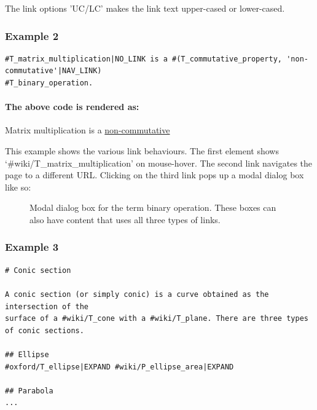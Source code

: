 \documentclass[runningheads]{llncs}
\begin{document}
The link options 'UC/LC' makes the link text upper-cased or lower-cased.

\subsubsection*{Example 2}
\begin{verbatim}
#T_matrix_multiplication|NO_LINK is a #(T_commutative_property, 'non-commutative'|NAV_LINK)
#T_binary_operation.
\end{verbatim}

\paragraph{The above code is rendered as:}
\begin{mdframed}
Matrix multiplication is a \underline{non-commutative} 
\end{mdframed}
This example shows the various link behaviours. The first element shows `\#wiki/T\_matrix\_multiplication' on mouse-hover. The second link navigates the page to a different URL. Clicking on the third link pops up a modal dialog box like so:

\begin{figure}
\begin{center}
\caption{Modal dialog box for the term binary operation. These boxes can also have content that uses all three types of links. }
\label{modal}
\end{center}
\end{figure}

\subsubsection*{Example 3}

\begin{verbatim}
# Conic section

A conic section (or simply conic) is a curve obtained as the intersection of the
surface of a #wiki/T_cone with a #wiki/T_plane. There are three types of conic sections.

## Ellipse
#oxford/T_ellipse|EXPAND #wiki/P_ellipse_area|EXPAND

## Parabola
...
\end{verbatim}
\end{document}
